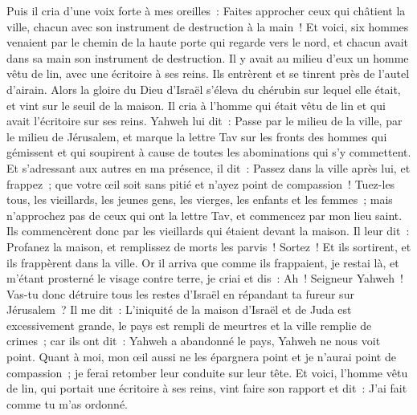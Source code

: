 \begin{multicols}{2}
\VerseOne{}Puis il cria d'une voix forte à mes oreilles~: Faites approcher ceux qui châtient la ville, chacun avec son instrument de destruction à la main~!
Et voici, six hommes venaient par le chemin de la haute porte qui regarde vers le nord, et chacun avait dans sa main son instrument de destruction. Il y avait au milieu d'eux un homme vêtu de lin, avec une écritoire à ses reins. Ils entrèrent et se tinrent près de l'autel d'airain.
Alors la gloire du Dieu d'Israël s'éleva du chérubin sur lequel elle était, et vint sur le seuil de la maison. Il cria à l'homme qui était vêtu de lin et qui avait l'écritoire sur ses reins.
Yahweh lui dit~: Passe par le milieu de la ville, par le milieu de Jérusalem, et marque la lettre Tav sur les fronts des hommes qui gémissent et qui soupirent à cause de toutes les abominations qui s'y commettent.
Et s'adressant aux autres en ma présence, il dit~: Passez dans la ville après lui, et frappez~; que votre œil soit sans pitié et n'ayez point de compassion~!
Tuez-les tous, les vieillards, les jeunes gens, les vierges, les enfants et les femmes~; mais n'approchez pas de ceux qui ont la lettre Tav, et commencez par mon lieu saint. Ils commencèrent donc par les vieillards qui étaient devant la maison.
Il leur dit~: Profanez la maison, et remplissez de morts les parvis~! Sortez~! Et ils sortirent, et ils frappèrent dans la ville.
Or il arriva que comme ils frappaient, je restai là, et m'étant prosterné le visage contre terre, je criai et dis~: Ah~! Seigneur Yahweh~! Vas-tu donc détruire tous les restes d'Israël en répandant ta fureur sur Jérusalem~?
Il me dit~: L'iniquité de la maison d'Israël et de Juda est excessivement grande, le pays est rempli de meurtres et la ville remplie de crimes~; car ils ont dit~: Yahweh a abandonné le pays, Yahweh ne nous voit point.
Quant à moi, mon œil aussi ne les épargnera point et je n'aurai point de compassion~; je ferai retomber leur conduite sur leur tête.
Et voici, l'homme vêtu de lin, qui portait une écritoire à ses reins, vint faire son rapport et dit~: J'ai fait comme tu m'as ordonné.

\end{multicols}
